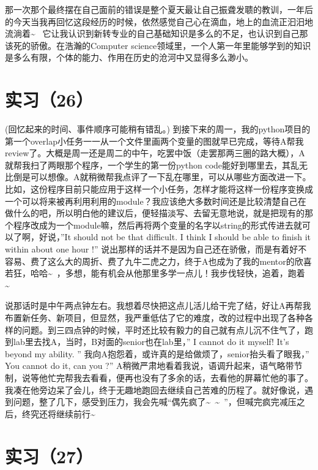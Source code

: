 \documentclass[12pt]{book}
\begin{document}
那一次那个最终摆在自己面前的错误是整个夏天最让自己振聋发聩的教训，一年后的今天当我再回忆这段经历的时候，依然感觉自己心在滴血，地上的血流正汩汨地流淌着\textasciitilde{}~ 它让我认识到新转专业的自己基础知识是多么的不足，也认识到自己那该死的骄傲。在浩瀚的Computer science领域里，一个人第一年里能够学到的知识是多么有限，个体的能力、作用在历史的沧河中又显得多么渺小。

\section{实习（26）}
\label{sec-5-29}

(回忆起来的时间、事件顺序可能稍有错乱。) 到接下来的周一，我的python项目的第一个overlap小任务一一从一个文件里画两个变量的图就早已完成，等待A帮我review了。大概是周一还是周二的中午，吃罢中饭（走罢那两三圈的路大概），A就帮我扫了两眼那个程序，一个学生的第一份python code能好到哪里去，其乱无比倒是可以想像。A就稍微帮我点评了一下乱在哪里，可以从哪些方面改进一下。比如，这份程序目前只能应用于这样一个小任务，怎样才能将这样一份程序变换成一个可以将来被再利用利用的module？我应该绝大多数时间还是比较清楚自己在做什么的吧，所以明白他的建议后，便轻描淡写、去留无意地说，就是把现有的那个程序改成为一个module嘛，然后再将两个变量的名字以string的形式传进去就可以了啊，好说，”It should not be that difficult.  I think I should be able to finish it within about one hour !” 说出那样的话并不是因为自己还在骄傲，而是有着好不容易、费了这么大的周折、费了九牛二虎之力，终于A也成为了我的mentor的欣喜若狂，哈哈\textasciitilde{}~，多想，能有机会从他那里多学一点儿！我步伐轻快，追着，跑着\textasciitilde{}~

说那话时是中午两点钟左右。我想着尽快把这点儿活儿给干完了结，好让A再帮我布置新任务、新项目，但显然，我严重低估了它的难度，改的过程中出现了各种各样的问题。到三四点钟的时候，平时还比较有毅力的自己就有点儿沉不住气了，跑到lab里去找A，当时，B对面的senior也在lab里，” I cannot do it myself!  It’s beyond my ability. ” 我向A抱怨着，或许真的是给做烦了，senior抬头看了眼我，” You cannot do it, can you ?” A稍微严肃地看着我说，语调升起来，语气略带节制，说等他忙完帮我去看看，便再也没有了多余的话，去看他的屏幕忙他的事了。我凑在他旁边呆了会儿，终于无趣地跑回去继续自己苦难的历程了。就好像说，遇到问题，整了几下，感受到压力，我会先喊“偶先疯了\textasciitilde{}~\textasciitilde{}~”，但喊完疯完减压之后，终究还将继续前行\textasciitilde{}~

\section{实习（27）}
\label{sec-5-30}
\end{document}
